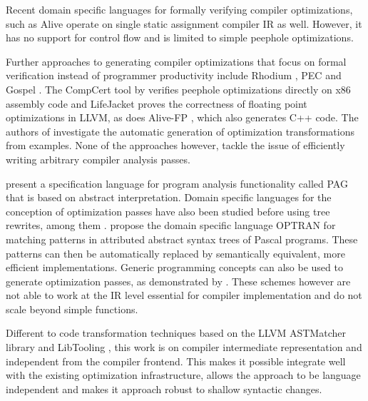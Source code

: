     Recent domain specific languages for formally verifying compiler
    optimizations, such as Alive \citep{Lopes:2015:PCP:2737924.2737965} operate
    on single static assignment compiler IR as well.
    However, it has no support for control flow and is limited to simple
    peephole optimizations.

    Further approaches to generating compiler optimizations that focus on formal
    verification instead of programmer productivity include Rhodium
    \citep{Lerner:2005:ASP:1040305.1040335}, PEC
    \citep{Kundu:2009:POC:1543135.1542513} and Gospel
    \citep{Whitfield:1997:AEC:267959.267960}.
    The CompCert tool by \citet{Mullen:2016:VPO:2908080.2908109} verifies
    peephole optimizations directly on x86 assembly code and LifeJacket
    \cite{Notzli:2016:LVP:2931021.2931024} proves the correctness of floating
    point optimizations in LLVM, as does Alive-FP \cite{Menendez2016}, which
    also generates C++ code.
    The authors of \cite{Tate:2010:GCO:1706299.1706345} investigate the
    automatic generation of optimization transformations from examples.
    None of the approaches however, tackle the issue of efficiently writing
    arbitrary compiler analysis passes.

    \citet{Martin1998} present a specification language for program analysis
    functionality called PAG that is based on abstract interpretation.
    Domain specific languages for the conception of optimization passes have
    also been studied before using tree rewrites, among them
    \citet{Olmos:2005:CSD:2136624.2136643}.
    \citet{Lipps1989} propose the domain specific language OPTRAN for matching
    patterns in attributed abstract syntax trees of Pascal programs.
    These patterns can then be automatically replaced by semantically
    equivalent, more efficient implementations. 
    Generic programming
    concepts can also be used to generate optimization passes, as
    demonstrated by \cite{Willcock:2009:RGP:1621607.1621611}.  These
    schemes however are not able to work at the IR level essential for
    compiler implementation and do not scale beyond simple functions.

    Different to code transformation techniques based on the LLVM ASTMatcher
    library and LibTooling \citep{be0fa11ddb194bde86a9dab8589b779c}, this work
    is on compiler intermediate representation and independent from
    the compiler frontend.
    This makes it possible integrate well with the existing optimization
    infrastructure, allows the approach to be language independent and makes it
    approach robust to shallow syntactic changes.

